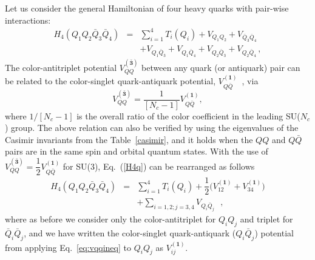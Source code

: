 \documentclass[twocolumn,showpacs,superscriptaddress,preprintnumbers,nofootinbib,prd]{revtex4-1}
\def\be{\begin{equation}}
\def\ee{\end{equation}}
\begin{document}
Let us consider the general Hamiltonian of four heavy quarks with pair-wise
interactions:
\begin{equation}
   \begin{array}{rcl}
H_{4}(Q_1 Q_2 \bar{Q}_3\bar{Q}_4) &=& \sum_{i=1}^{4} T_i (Q_i)+ V_{Q_1 Q_2} + V_{\bar{Q}_3 \bar{Q}_4} \\
&& + V_{Q_1 \bar{Q}_3}+ V_{Q_1 \bar{Q}_4}+ V_{Q_2 \bar{Q}_3}+ V_{Q_2 \bar{Q}_4}
\,,
\end{array}
\label{H4q}
\end{equation}
The color-antitriplet potential $V_{QQ}^{(\bar{\textbf{3}})}$ between any quark
(or antiquark) pair
can be related to the color-singlet quark-antiquark potential,
$V_{Q\bar{Q}}^{(\textbf{1})}$~\cite{Iwao:1984pr}, via
\be
V_{QQ}^{(\bar{\textbf{3}})}=\frac{1}{[N_c-1]} V_{Q\bar{Q}}^{(\textbf{1})},
\label{eq:vqqineq}
\ee
where $1/[N_c -1]$ is the overall ratio of the color coefficient in the
leading SU($N_c$) group. The above relation can also be verified by using
the eigenvalues of the Casimir invariants from the Table~\ref{casimir},
and it holds when the $QQ$ and $Q\bar{Q}$
pairs are in the same spin and orbital quantum states. With the use of
$V_{QQ}^{(\bar{\textbf{3}})}=\dfrac{1}{2}V_{Q\bar{Q}}^{(\textbf{1})}$ for SU(3),
Eq.~(\ref{H4q})
can be rearranged as follows
\begin{eqnarray}
H_{4}(Q_1 Q_2 \bar{Q}_3\bar{Q}_4) &=& \sum_{i=1}^{4} T_i (Q_i) + \dfrac{1}{2}
\bigg (
V_{12}^{(\textbf{1})} + V_{34}^{(\textbf{1})}
\bigg) \nonumber\\
&& +\sum_{i=1,2;j=3,4} V_{Q_i \bar{Q}_j}\mbox{ },
\label{H4q2}
\end{eqnarray}
where as before we consider only the color-antitriplet for $Q_iQ_j$ and
triplet for $\bar Q_i\bar Q_j$, and we have written the
color-singlet quark-antiquark ($Q_i\bar Q_j$)
potential from applying Eq.~\eqref{eq:vqqineq} to $Q_iQ_j$ as
$V_{ij}^{(\textbf{1})}$.
\end{document}
